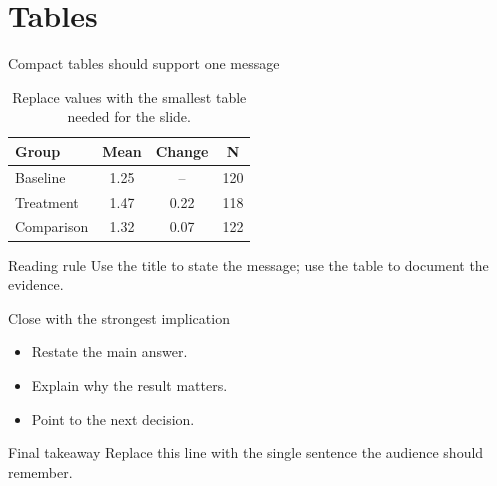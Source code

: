 \section{Tables}

\begin{frame}{Compact tables should support one message}
\begin{table}
\centering
\begin{tabular}{lccc}
\toprule
Group & Mean & Change & N \\
\midrule
Baseline & 1.25 & -- & 120 \\
Treatment & 1.47 & 0.22 & 118 \\
Comparison & 1.32 & 0.07 & 122 \\
\bottomrule
\end{tabular}
\caption{Replace values with the smallest table needed for the slide.}
\end{table}
\vfill
\begin{exampleblock}{Reading rule}
Use the title to state the message; use the table to document the evidence.
\end{exampleblock}
\end{frame}

\begin{frame}{Close with the strongest implication}
\begin{itemize}
  \setlength{\itemsep}{7pt}
  \item Restate the main answer.
  \item Explain why the result matters.
  \item Point to the next decision.
\end{itemize}
\vfill
\begin{block}{Final takeaway}
Replace this line with the single sentence the audience should remember.
\end{block}
\end{frame}
